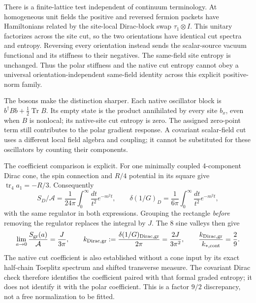 \documentclass[10pt]{article}
\newcommand{\Tr}{\operatorname{Tr}}
\begin{document}
There is a finite-lattice test independent of continuum terminology.
At homogeneous unit fields the positive and reversed fermion packets
have Hamiltonians related by the site-local Dirac-block swap
$\tau_1\otimes I$. This unitary factorizes across the site cut, so
the two orientations have identical cut spectra and entropy.
Reversing every orientation instead sends the scalar-source vacuum
functional and its stiffness to their negatives. The same-field
site entropy is unchanged. Thus the polar stiffness and the native
cut entropy cannot obey a universal orientation-independent
same-field identity across this explicit positive-norm family.

The bosons make the distinction sharper. Each native oscillator
block is $b^\dagger B b+\tfrac12\Tr B$. Its empty state is the
product annihilated by every site $b_x$, even when $B$ is nonlocal;
its native-site cut entropy is zero. The assigned zero-point term
still contributes to the polar gradient response. A covariant
scalar-field cut uses a different local field algebra and coupling;
it cannot be substituted for these oscillators by counting their
components.

The coefficient comparison is explicit. For one minimally coupled
4-component Dirac cone, the spin connection and $R/4$ potential in
its square give $\operatorname{tr}_4a_1=-R/3$. Consequently
\[
 S_D/\mathcal A=\frac1{24\pi}\int_0^\infty\frac{dt}{t^2}e^{-m^2t},
 \qquad \delta(1/G)_D=\frac1{6\pi}
                   \int_0^\infty\frac{dt}{t^2}e^{-m^2t},
\]
with the same regulator in both expressions. Grouping the rectangle
\emph{before} removing the regulator replaces the integral by $J$.
The 8 sine valleys then give
\begin{equation}
 \lim_{a\to0}\frac{S_{\rm gr}(a)}{\mathcal A}=\frac{J}{3\pi},\qquad
 k_{\mathrm{Dirac,gr}}:=\frac{\delta(1/G)_{\mathrm{Dirac,gr}}}{2\pi}
       =\frac{2J}{3\pi^2},\qquad
 \frac{k_{\mathrm{Dirac,gr}}}{k_{*,\mathrm{cont}}}=\frac29.
 \label{eq:ec-coefficients}
\end{equation}
The native cut coefficient is also established without a cone input
by its exact half-chain Toeplitz spectrum and shifted transverse
measure. The covariant Dirac check therefore identifies the
coefficient paired with that formal graded entropy; it does not
identify it with the polar coefficient. This is a factor $9/2$
discrepancy, not a free normalization to be fitted.
\end{document}
